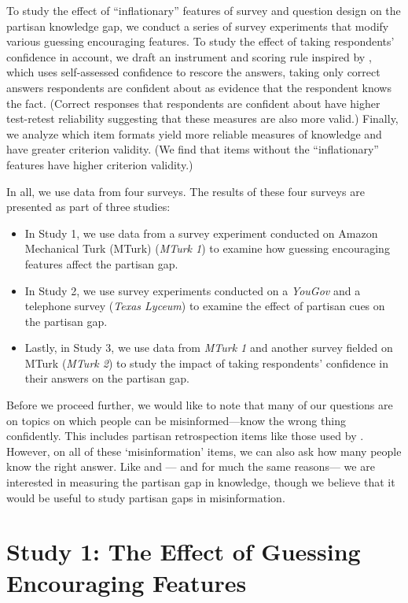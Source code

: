 \documentclass[12pt, letterpaper]{article}
\begin{document}
To study the effect of ``inflationary'' features of survey and question design on the partisan knowledge gap, we conduct a series of survey experiments that modify various guessing encouraging features. To study the effect of taking respondents' confidence in account, we draft an instrument and scoring rule inspired by \citet{pasek2015}, which uses self-assessed confidence to rescore the answers, taking only correct answers respondents are confident about as evidence that the respondent knows the fact. (Correct responses that respondents are confident about have higher test-retest reliability \citep{graham2021measuring} suggesting that these measures are also more valid.) Finally, we analyze which item formats yield more reliable measures of knowledge and have greater criterion validity. (We find that items without the ``inflationary'' features have higher criterion validity.)

In all, we use data from four surveys. The results of these four surveys are presented as part of three studies:

\begin{itemize}
    \item In Study 1, we use data from a survey experiment conducted on Amazon Mechanical Turk (MTurk) (\emph{MTurk 1}) to examine how guessing encouraging features affect the partisan gap. 
    \item In Study 2, we use survey experiments conducted on a \emph{YouGov} and a telephone survey (\emph{Texas Lyceum}) to examine the effect of partisan cues on the partisan gap.
    \item Lastly, in Study 3, we use data from \emph{MTurk 1} and another survey fielded on MTurk (\emph{MTurk 2}) to study the impact of taking respondents' confidence in their answers on the partisan gap.
\end{itemize}

Before we proceed further, we would like to note that many of our questions are on topics on which people can be misinformed---know the wrong thing confidently. This includes partisan retrospection items like those used by \cite{bartels_2002}. However, on all of these `misinformation' items, we can also ask how many people know the right answer. Like \citet{bartels_2002} and \citet{prior2015you}--- and for much the same reasons--- we are interested in measuring the partisan gap in knowledge, though we believe that it would be useful to study partisan gaps in misinformation. 

\section*{Study 1: The Effect of Guessing Encouraging Features} \label{sec:inflationary_measures}
\end{document}
